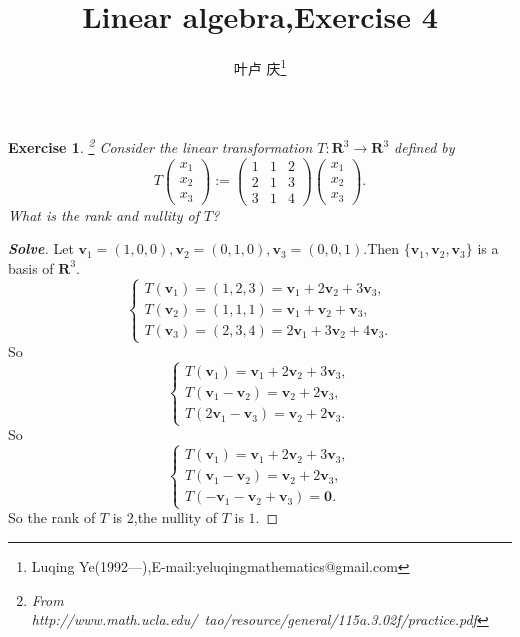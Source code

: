 \documentclass[a4paper]{article}
\newtheorem*{exe}{Exercise}
\newenvironment{exercise}
{\bigskip\begin{mdframed}\begin{exe}}
    {\end{exe}\end{mdframed}\bigskip}
\begin{document}
\title{\huge{\bf{Linear algebra,Exercise 4}}} \author{\small{叶卢
    庆\footnote{Luqing
      Ye(1992---),E-mail:yeluqingmathematics@gmail.com}}}
\maketitle
\begin{exercise}\footnote{From
    http://www.math.ucla.edu/~tao/resource/general/115a.3.02f/practice.pdf}
  Consider the linear transformation $T:\mathbf{R}^3\to \mathbf{R}^3$
  defined by
$$
T \begin{pmatrix}
  x_1\\
  x_2\\
  x_3
\end{pmatrix}:=\begin{pmatrix}
  1&1&2\\
  2&1&3\\
  3&1&4
\end{pmatrix}\begin{pmatrix}
  x_1\\
  x_2\\
  x_3
\end{pmatrix}.
$$
What is the rank and nullity of $T$?
\end{exercise}
\begin{proof}[\textbf{Solve}]
  Let
  $\mathbf{v}_1=(1,0,0),\mathbf{v}_2=(0,1,0),\mathbf{v}_3=(0,0,1)$.Then
  $\{\mathbf{v}_1,\mathbf{v}_2,\mathbf{v}_3\}$ is a basis of
  $\mathbf{R}^3$.
$$
\begin{cases}
  T(\mathbf{v}_1)=(1,2,3)=\mathbf{v}_1+2\mathbf{v}_2+3\mathbf{v}_3,\\
  T(\mathbf{v}_2)=(1,1,1)=\mathbf{v}_1+\mathbf{v}_2+\mathbf{v}_3,\\
  T(\mathbf{v}_3)=(2,3,4)=2\mathbf{v}_1+3\mathbf{v}_2+4\mathbf{v}_3.
\end{cases}
$$
So
$$
\begin{cases}
  T(\mathbf{v}_1)=\mathbf{v}_1+2\mathbf{v}_2+3\mathbf{v}_3,\\
T(\mathbf{v}_1-\mathbf{v}_2)=\mathbf{v}_2+2\mathbf{v}_3,\\
T(2\mathbf{v}_1-\mathbf{v}_3)=\mathbf{v}_2+2\mathbf{v}_3.
\end{cases}
$$
So
$$
\begin{cases}
  T(\mathbf{v}_1)=\mathbf{v}_1+2\mathbf{v}_2+3\mathbf{v}_3,\\
T(\mathbf{v}_1-\mathbf{v}_2)=\mathbf{v}_2+2\mathbf{v}_3,\\
T(-\mathbf{v}_1-\mathbf{v}_2+\mathbf{v}_3)=\mathbf{0}.
\end{cases}
$$
So the rank of $T$ is $2$,the
nullity of $T$ is $1$.
\end{proof}
\end{document}
